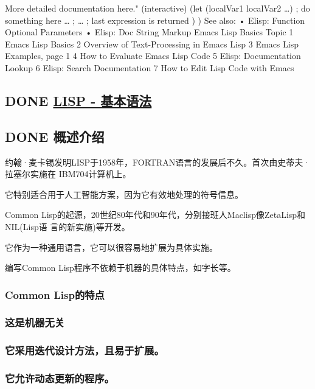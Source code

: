 \documentclass[11pt]{ctexart}
\begin{document}
{{{{More detailed documentation here."
(interactive)
(let (localVar1 localVar2 …)
; do something here …
; …
; last expression is returned
)
)
See also:
•	Elisp: Function Optional Parameters
•	Elisp: Doc String Markup
Emacs Lisp Basics Topic
1	Emacs Lisp Basics
2	Overview of Text-Processing in Emacs Lisp
3	Emacs Lisp Examples, page 1
4	How to Evaluate Emacs Lisp Code
5	Elisp: Documentation Lookup
6	Elisp: Search Documentation
7	How to Edit Lisp Code with Emacs

\subsection{{\bfseries\sffamily DONE} \href{http://www.yiibai.com/lisp/lisp\_basic\_syntax.html}{LISP - 基本语法}}
\label{sec:org5e54425}
\subsection{{\bfseries\sffamily DONE} 概述介绍}
\label{sec:org121ba81}
约翰·麦卡锡发明LISP于1958年，FORTRAN语言的发展后不久。首次由史蒂夫·拉塞尔实施在
IBM704计算机上。

它特别适合用于人工智能方案，因为它有效地处理的符号信息。

Common Lisp的起源，20世纪80年代和90年代，分别接班人Maclisp像ZetaLisp和NIL(Lisp语
言的新实施)等开发。

它作为一种通用语言，它可以很容易地扩展为具体实施。

编写Common Lisp程序不依赖于机器的具体特点，如字长等。

\subsubsection{Common Lisp的特点}
\label{sec:org790c6ca}

\subsubsection{这是机器无关}
\label{sec:orgf284ec4}

\subsubsection{它采用迭代设计方法，且易于扩展。}
\label{sec:org1a05ec2}

\subsubsection{它允许动态更新的程序。}
\label{sec:orgca9e93f}

}}}}
\end{document}
